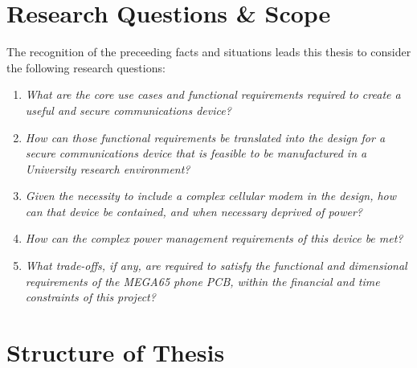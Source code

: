 
\section{Research Questions \& Scope}
\label{sec3}

The recognition of the preceeding facts and situations leads this thesis to consider the following research questions:
\begin{enumerate}
	\item \textit{What are the core use cases and functional requirements required to create a useful and secure communications device?}\\
	\item \textit{How can those functional requirements be translated into the design for a secure communications device that is feasible to be manufactured in a University research environment?}\\
	\item \textit{Given the necessity to include a complex cellular modem in the design, how can that device be contained, and when necessary deprived of power?}\\
	\item \textit{How can the complex power management requirements of this device be met?}\\
	\item \textit{What trade-offs, if any, are required to satisfy the functional and dimensional requirements of the MEGA65 phone PCB, within the financial and time constraints of this project?}\\
\end{enumerate}

\section{Structure of Thesis}

